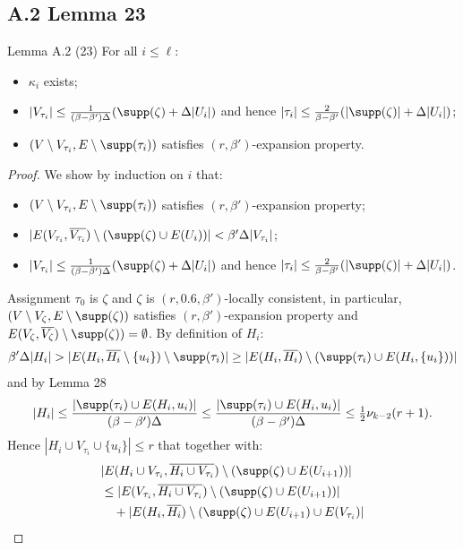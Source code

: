 \subsection*{A.2 Lemma 23}
\begin{result}{Lemma A.2 (23)}
For all $i\le\ell$:
\begin{itemize}\item $\kappa_i$ exists;
\item $|V_{\tau_i}|\le\frac{1}{(\beta-\beta')\Delta}(\supp(\zeta)+\Delta|U_i|)$ and hence $|\tau_i|\le\frac{2}{\beta-\beta'}(|\supp(\zeta)|+\Delta|U_i|)$;
\item $(V\setminus V_{\tau_i},E\setminus\supp(\tau_i))$ satisfies $(r,\beta')$-expansion property.\end{itemize}
\end{result}
\begin{proof}
We show by induction on $i$ that:
\begin{itemize}\item $(V\setminus V_{\tau_i},E\setminus\supp(\tau_i))$ satisfies $(r,\beta')$-expansion property;
\item $|E(V_{\tau_i},\overline{V_{\tau_i}})\setminus(\supp(\zeta)\cup E(U_i))|<\beta'\Delta|V_{\tau_i}|$;
\item $|V_{\tau_i}|\le\frac{1}{(\beta-\beta')\Delta}(\supp(\zeta)+\Delta|U_i|)$ and hence $|\tau_i|\le\frac{2}{\beta-\beta'}(|\supp(\zeta)|+\Delta|U_i|)$.\end{itemize}
Assignment $\tau_0$ is $\zeta$ and $\zeta$ is $(r,0.6,\beta')$-locally consistent, in particular, $(V\setminus V_\zeta,E\setminus\supp(\zeta))$ satisfies $(r,\beta')$-expansion property and $E(V_\zeta,\overline{V_\zeta})\setminus\supp(\zeta))=\emptyset$.
By definition of $H_i$:
\[\beta'\Delta|H_i|>|E(H_i,\overline{H_i}\setminus\{u_i\})\setminus\supp(\tau_i)|\ge|E(H_i,\overline{H_i})\setminus(\supp(\tau_i)\cup E(H_i,\{u_i\}))|\]
and by Lemma 28
\[|H_i|\le\frac{|\supp(\tau_i)\cup E(H_i,u_i)|}{(\beta-\beta')\Delta}\le\frac{|\supp(\tau_i)\cup E(H_i,u_i)|}{(\beta-\beta')\Delta}\le\tfrac12\nu_{k-2}(r+1).\]
Hence $|H_i\cup V_{\tau_i}\cup\{u_i\}|\le r$ that together with:
\begin{align*}
&|E(H_i\cup V_{\tau_i},\overline{H_i\cup V_{\tau_i}})\setminus(\supp(\zeta)\cup E(U_{i+1}))|\\
&\le |E(V_{\tau_i},\overline{H_i\cup V_{\tau_i}})\setminus(\supp(\zeta)\cup E(U_{i+1}))|\\
&\quad+|E(H_i,\overline{H_i})\setminus(\supp(\zeta)\cup E(U_{i+1})\cup E(V_{\tau_i})|\\

\end{align*}
\end{proof}

